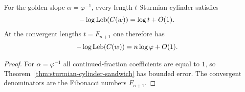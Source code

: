 \begin{corollary}\label{cor:golden-sturmian-rigidity}
For the golden slope $\alpha=\varphi^{-1}$, every length-$t$ Sturmian cylinder
satisfies
\[
  -\log\mathrm{Leb}(C(w))=\log t+O(1).
\]
At the convergent lengths $t=F_{n+1}$ one therefore has
\[
  -\log\mathrm{Leb}(C(w))=n\log\varphi+O(1).
\]
\end{corollary}

\begin{proof}
For $\alpha=\varphi^{-1}$ all continued-fraction coefficients are equal to $1$,
so Theorem~\ref{thm:sturmian-cylinder-sandwich} has bounded error. The
convergent denominators are the Fibonacci numbers $F_{n+1}$.
\end{proof}

